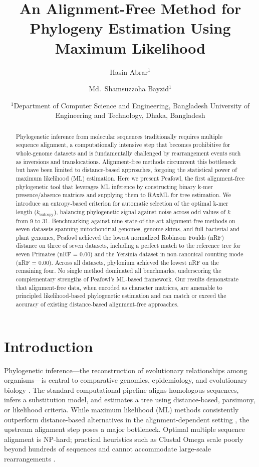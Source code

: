 \documentclass[11pt]{article}
\title{An Alignment-Free Method for Phylogeny Estimation Using Maximum Likelihood}
\author{
  Hasin Abrar$^{1}$ \and
  Md.\ Shamsuzzoha Bayzid$^{1}$
}
\date{
  $^{1}$Department of Computer Science and Engineering, Bangladesh University of Engineering and Technology, Dhaka, Bangladesh
}
\begin{document}
\maketitle

\begin{abstract}
Phylogenetic inference from molecular sequences traditionally requires multiple sequence alignment, a computationally intensive step that becomes prohibitive for whole-genome datasets and is fundamentally challenged by rearrangement events such as inversions and translocations. Alignment-free methods circumvent this bottleneck but have been limited to distance-based approaches, forgoing the statistical power of maximum likelihood (ML) estimation. Here we present Peafowl, the first alignment-free phylogenetic tool that leverages ML inference by constructing binary k-mer presence/absence matrices and supplying them to RAxML for tree estimation. We introduce an entropy-based criterion for automatic selection of the optimal k-mer length ($k_{\text{entropy}}$), balancing phylogenetic signal against noise across odd values of $k$ from 9 to 31. Benchmarking against nine state-of-the-art alignment-free methods on seven datasets spanning mitochondrial genomes, genome skims, and full bacterial and plant genomes, Peafowl achieved the lowest normalized Robinson--Foulds (nRF) distance on three of seven datasets, including a perfect match to the reference tree for seven Primates (nRF = 0.00) and the Yersinia dataset in non-canonical counting mode (nRF = 0.00). Across all datasets, phylonium achieved the lowest nRF on the remaining four. No single method dominated all benchmarks, underscoring the complementary strengths of Peafowl's ML-based framework. Our results demonstrate that alignment-free data, when encoded as character matrices, are amenable to principled likelihood-based phylogenetic estimation and can match or exceed the accuracy of existing distance-based alignment-free approaches.
\end{abstract}

\section{Introduction}

Phylogenetic inference---the reconstruction of evolutionary relationships among organisms---is central to comparative genomics, epidemiology, and evolutionary biology \citep{felsenstein1981, chan2014}. The standard computational pipeline aligns homologous sequences, infers a substitution model, and estimates a tree using distance-based, parsimony, or likelihood criteria. While maximum likelihood (ML) methods consistently outperform distance-based alternatives in the alignment-dependent setting \citep{felsenstein1981, huelsenbeck2001}, the upstream alignment step poses a major bottleneck. Optimal multiple sequence alignment is NP-hard; practical heuristics such as Clustal Omega scale poorly beyond hundreds of sequences and cannot accommodate large-scale rearrangements \citep{sievers2011}.
\end{document}
